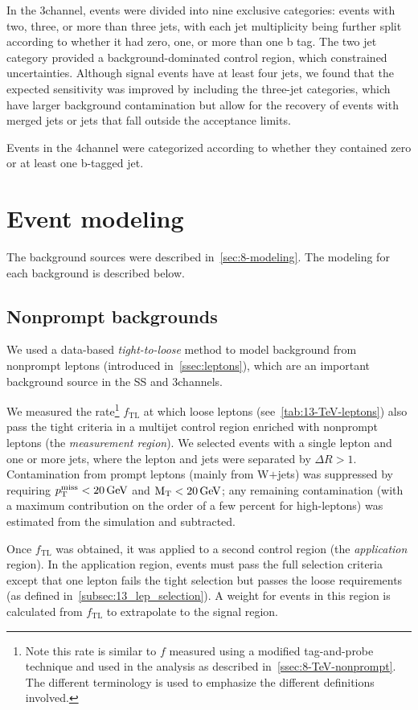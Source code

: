 In the 3\lep \ttZ channel, events were divided into nine exclusive categories: events with two,
three, or more than three jets, with each jet multiplicity being further split according to whether
it had zero, one, or more than one b tag. The two jet category provided a background-dominated
control region, which constrained uncertainties. Although signal \ttZ events have at least four
jets, we found that the expected sensitivity was improved by including the three-jet categories,
which have larger background contamination but allow for the recovery of events with merged jets or
jets that fall outside the acceptance limits.

Events in the 4\lep \ttZ channel were categorized according to whether they contained zero or at
least one b-tagged jet.

\section{Event modeling}
The background sources were described in~\cref{sec:8-modeling}. The modeling for each background is described below.

\subsection{Nonprompt backgrounds}
\label{ssec:13-TeV-nonprompt}
We used a data-based \emph{tight-to-loose} method to model background from nonprompt leptons
(introduced in~\cref{ssec:leptons}), which are an important background source in the SS \ttW and
3\lep channels.

We measured the rate\footnote{Note this rate is similar to $f$ measured using a modified
tag-and-probe technique and used in the \eightTeV analysis as described
in~\cref{ssec:8-TeV-nonprompt}. The different terminology is used to emphasize the different
definitions involved.} $f_\text{TL}$ at which loose leptons (see~\cref{tab:13-TeV-leptons}) also
pass the tight criteria in a multijet control region enriched with nonprompt leptons (the
\emph{measurement region}). We selected events with a single lepton and one or more jets, where the
lepton and jets were separated by $\Delta R > 1$. Contamination from prompt leptons (mainly from
W$+$jets) was suppressed by requiring $p_\text{T}^\text{miss}<\SI{20}{GeV}$ and $\text{M}_\text{T}<\SI{20}{GeV}$; any remaining
contamination (with a maximum contribution on the order of a few percent for high-\pT leptons) was
estimated from the simulation and subtracted.

Once $f_\text{TL}$ was obtained, it was applied to a second control region (the \emph{application}
region). In the application region, events must pass the full selection criteria except that one
lepton fails the tight selection but passes the loose requirements (as defined
in~\cref{subsec:13_lep_selection}). A weight for events in this region is calculated from
$f_\text{TL}$ to extrapolate to the signal region.

